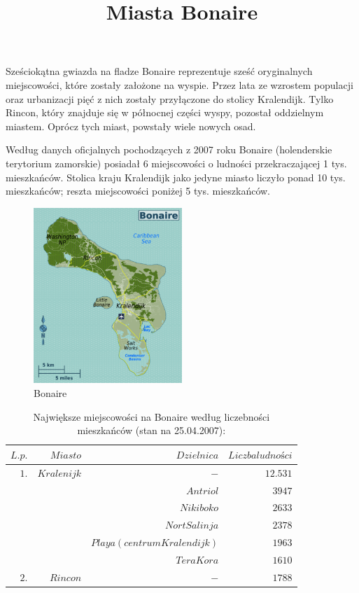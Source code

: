 \documentclass{article}
\begin{document}
\title{Miasta Bonaire}

\maketitle

Sześciokątna gwiazda na fladze Bonaire reprezentuje sześć oryginalnych miejscowości, które zostały założone na wyspie. Przez lata ze wzrostem populacji oraz urbanizacji pięć z nich zostały przyłączone do stolicy Kralendijk. Tylko Rincon, który znajduje się w północnej części wyspy, pozostał oddzielnym miastem. Oprócz tych miast, powstały wiele nowych osad.

Według danych oficjalnych pochodzących z 2007 roku Bonaire (holenderskie terytorium zamorskie) posiadał 6 miejscowości o ludności przekraczającej 1 tys. mieszkańców. Stolica kraju Kralendijk jako jedyne miasto liczyło ponad 10 tys. mieszkańców; reszta miejscowości poniżej 5 tys. mieszkańców.




\begin{figure}[h!]
 \caption{Bonaire}
\centering
  \includegraphics[width=0.5\textwidth]{bonaire.png}

\end{figure}

\begin{table}[here]
\centering \caption{Największe miejscowości na Bonaire według liczebności mieszkańców (stan na 25.04.2007):}
\begin{tabular}{|r|r|r|r|}
  \hline
  $L.p.$ & $Miasto$ & $Dzielnica$ & $Liczba ludności$ \\
  \hline
  $1.$ & $Kralenijk$ & $-$ & $12.531$ \\
  \hline
  $ $ & $ $ & $Antriol$ & $3 947$ \\
  \hline
  $ $ & $ $ & $Nikiboko$ & $2 633$ \\
  \hline
  $ $ & $ $ & $Nort Salinja$ & $2 378$ \\
  \hline
  $ $ & $ $ & $Playa (centrum Kralendijk)$ & $1963$ \\
  \hline
  $ $ & $ $ & $Tera Kora$ & $1 610$ \\
  \hline
  $2.$ & $Rincon$ & $-$ & $1 788$ \\
  \hline
\end{tabular}
\end{table}
\end{document}
